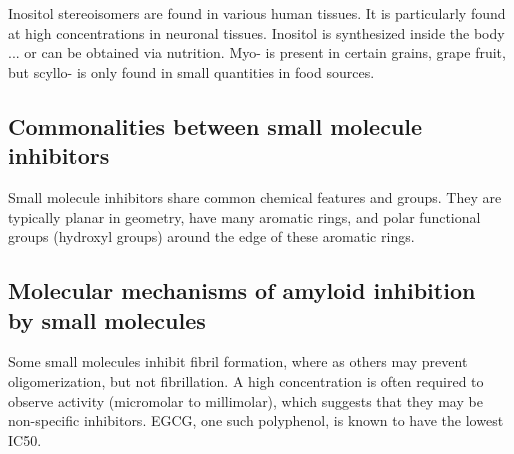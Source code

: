 Inositol stereoisomers are found in various human tissues. It is particularly found at high concentrations in neuronal tissues. Inositol is synthesized inside the body ... or can be obtained via nutrition.  Myo- is present in certain grains, grape fruit, but scyllo- is only found in small quantities in food sources.
	
		
			

\subsection{Commonalities between small molecule inhibitors}
Small molecule inhibitors share common chemical features and groups.  They are typically planar in geometry, have many aromatic rings, and polar functional groups (hydroxyl groups) around the edge of these aromatic rings.



\subsection{Molecular mechanisms of amyloid inhibition 
	            \\ by small molecules}
Some small molecules inhibit fibril formation, where as others may prevent oligomerization, but not fibrillation. A high concentration is often required to observe activity (micromolar to millimolar), which suggests that they may be non-specific inhibitors. EGCG, one such polyphenol, is known to have the lowest IC50.
      
